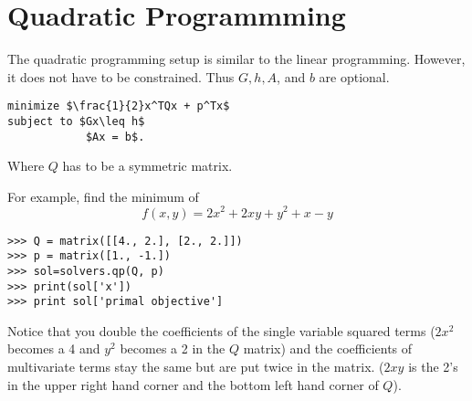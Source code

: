 \begin{comment}
or 
\begin{lstlisting}
>>> from cvxopt import matrix, solvers, glpk
>>> G = matrix([ [-1., 0., 0., 0., 0., 0.],
             [0., -1., 0., 0., 0., 0.],
             [0., 0., -1., 0., 0., 0.],
             [0., 0., 0., -1., 0., 0.],
             [0., 0., 0., 0., -1., 0.],
             [0., 0., 0., 0., 0., -1.] ])

>>> h = matrix([ 0., 0., 0., 0., 0., 0.,])
>>> o = matrix([4., 7., 6., 8., 8., 9])
>>> A = matrix([ [1., 0., 0., 1., 0.],
             [1., 0., 0., 0., 1.],
             [0., 1., 0., 1., 0.],
             [0., 1., 0., 0., 1.],
             [0., 0., 1., 1., 0.],
             [0., 0., 1., 0., 1.] ])
>>> b = matrix([7., 2., 4., 5., 8])
>>> sol = glpk.ilp(o,G,h,A,b)
>>> print sol[1]
\end{lstlisting} 

\textbf{Problem 2}
Choose one of these methods and compare the optimal values for the integer linear program to the result you received above. 

\textbf{Problem 3}
Create the dual problem for the linear program and solve. 
Compare your answer to the dual value cvxopt returned. 
\end{comment}
\section*{Quadratic Programmming}

The quadratic programming setup is similar to the linear programming.
However, it does not have to be constrained.
Thus $G, h, A$, and $b$ are optional.

\begin{lstlisting}[mathescape]
minimize $\frac{1}{2}x^TQx + p^Tx$
subject to $Gx\leq h$
	        $Ax = b$.
\end{lstlisting}

Where $Q$ has to be a symmetric matrix.

For example, find the minimum of 
\begin{equation}
f(x,y) = 2x^2 +2xy + y^2 +x -y
\end{equation}
\begin{lstlisting}
>>> Q = matrix([[4., 2.], [2., 2.]])
>>> p = matrix([1., -1.])
>>> sol=solvers.qp(Q, p)
>>> print(sol['x'])
>>> print sol['primal objective']
\end{lstlisting}
Notice that you double the coefficients of the single variable squared terms ($2x^2$ becomes a 4 and $y^2$ becomes a 2  in the $Q$ matrix) and the coefficients of multivariate terms stay the same but are put twice in the matrix. ($2xy$ is the 2's in the upper right hand corner and the bottom left hand corner of $Q$).

